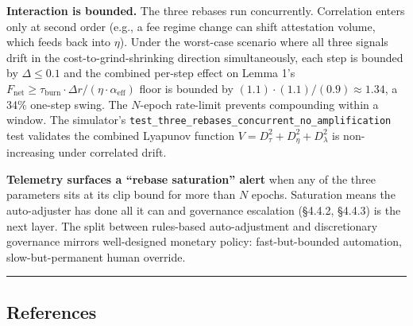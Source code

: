 \documentclass[
  11pt,
]{article}
\begin{document}
\textbf{Interaction is bounded.} The three rebases run concurrently.
Correlation enters only at second order (e.g., a fee regime change can
shift attestation volume, which feeds back into \(\eta\)). Under the
worst-case scenario where all three signals drift in the
cost-to-grind-shrinking direction simultaneously, each step is bounded
by \(\Delta \leq 0.1\) and the combined per-step effect on Lemma 1's
\(F_{\text{net}} \geq \tau_{\text{burn}} \cdot \Delta r / (\eta \cdot \alpha_{\text{eff}})\)
floor is bounded by \((1.1) \cdot (1.1) / (0.9) \approx 1.34\), a 34\%
one-step swing. The \(N\)-epoch rate-limit prevents compounding within a
window. The simulator's
\texttt{test\_three\_rebases\_concurrent\_no\_amplification} test
validates the combined Lyapunov function
\(V = D_\tau^2 + D_\eta^2 + D_\lambda^2\) is non-increasing under
correlated drift.

\textbf{Telemetry surfaces a ``rebase saturation'' alert} when any of
the three parameters sits at its clip bound for more than \(N\) epochs.
Saturation means the auto-adjuster has done all it can and governance
escalation (§4.4.2, §4.4.3) is the next layer. The split between
rules-based auto-adjustment and discretionary governance mirrors
well-designed monetary policy: fast-but-bounded automation,
slow-but-permanent human override.

\begin{center}\rule{0.5\linewidth}{0.5pt}\end{center}

\newpage

\subsection{References}\label{references}
\end{document}
